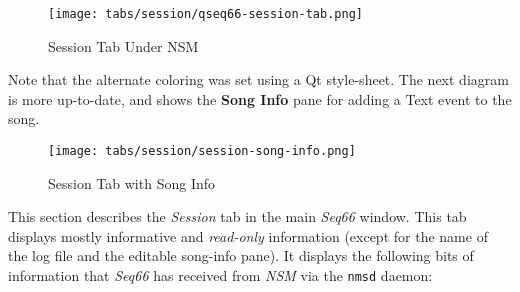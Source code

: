 \begin{figure}[H]
   \centering 
   \texttt{[image: tabs/session/qseq66-session-tab.png]}
   \caption*{Session Tab Under NSM}
\end{figure}

   Note that the alternate coloring was set using a Qt style-sheet.
   The next diagram is more up-to-date, and shows the \textbf{Song Info}
   pane for adding a Text event to the song.

\begin{figure}[H]
   \centering 
   \texttt{[image: tabs/session/session-song-info.png]}
   \caption*{Session Tab with Song Info}
\end{figure}

   This section describes the \textsl{Session} tab in the main
   \textsl{Seq66} window.  This tab displays mostly informative and
   \textsl{read-only} information (except for the name of the log file
   and the editable song-info pane).
   It displays the following bits of information that \textsl{Seq66} has
   received from \textsl{NSM} via the \texttt{nmsd} daemon:

